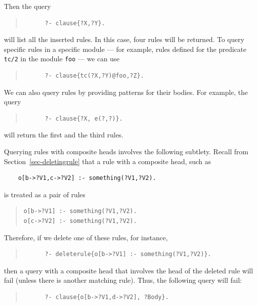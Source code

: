 \documentclass[11pt]{article}
\begin{document}
Then the query
\begin{quote}
\begin{verbatim}
      ?- clause{?X,?Y}.
\end{verbatim}
\end{quote}
\noindent
will list all the inserted rules.  In this case, four rules will be
returned.  To query specific rules in a specific module --- for example,
rules defined for the predicate {\tt tc/2} in the module {\tt foo} --- we
can use
\begin{quote}
\begin{verbatim}
      ?- clause{tc(?X,?Y)@foo,?Z}.
\end{verbatim}
\end{quote}
We can also query rules by providing patterns for their bodies. For
example, the query
\begin{quote}
\begin{verbatim}
      ?- clause{?X, e(?,?)}.
\end{verbatim}
\end{quote}
\noindent
will return the first and the third rules.

Querying rules with composite heads involves the following  subtlety.
Recall from Section~\ref{sec-deletingrule} 
that a rule with a composite head, such as 
\begin{verbatim}
    o[b->?V1,c->?V2] :- something(?V1,?V2).     
\end{verbatim}
is treated as a pair of rules
\begin{quote}
\begin{verbatim}
o[b->?V1] :- something(?V1,?V2).     
o[c->?V2] :- something(?V1,?V2).     
\end{verbatim}
\end{quote}
Therefore, if we delete one of these rules, for instance,
\begin{quote}
\begin{verbatim}
      ?- deleterule{o[b->?V1] :- something(?V1,?V2)}.
\end{verbatim}
\end{quote}
then a query with a composite head that involves the head of the deleted
rule will fail (unless there is another matching rule).
Thus, the following query will fail:
\begin{quote}
\begin{verbatim}
      ?- clause{o[b->?V1,d->?V2], ?Body}.
\end{verbatim}
\end{quote}
\end{document}
